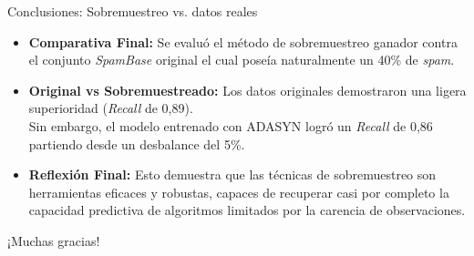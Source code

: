 \documentclass[10pt]{beamer}
\begin{document}
\begin{frame}{Conclusiones: Sobremuestreo vs. datos reales}
  \begin{itemize}
    \item \textbf{Comparativa Final:} 
    Se evaluó el método de sobremuestreo ganador contra el conjunto \textit{SpamBase} original el cual poseía naturalmente un 40\% de \textit{spam}.
    \vspace{0.2cm}
    \item \textbf{Original vs Sobremuestreado:} 
    Los datos originales demostraron una ligera superioridad (\textit{Recall} de 0,89). 
    \\
     Sin embargo, el modelo entrenado con ADASYN logró un \textit{Recall} de 0,86 partiendo desde un desbalance del 5\%. 
    \vspace{0.2cm}
    \item \textbf{Reflexión Final:} Esto demuestra que las técnicas de sobremuestreo son herramientas eficaces y robustas, capaces de recuperar casi por completo la capacidad predictiva de algoritmos limitados por la carencia de observaciones.
  \end{itemize}
\end{frame}

\begin{frame}[standout]
  ¡Muchas gracias!
\end{frame}
\end{document}
